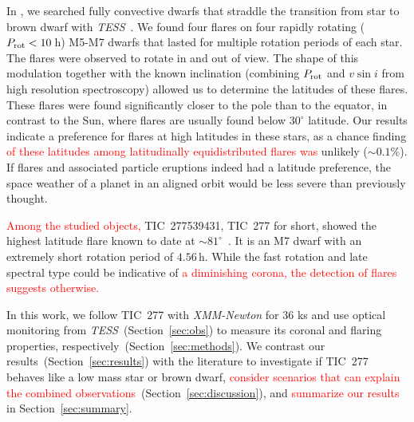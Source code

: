\documentclass[twocolumn]{aastex631}
\begin{document}
In \citet{ilin2021giant}, we searched fully convective dwarfs that straddle the transition from star to brown dwarf with \textit{TESS}~\citep{ricker2015transiting}. We found four flares on four rapidly rotating ($P_{\rm rot}<10\,$h) M5-M7 dwarfs that lasted for multiple rotation periods of each star. The flares were observed to rotate in and out of view. The shape of this modulation together with the known inclination (combining $P_{\rm rot}$ and $v \sin i$ from high resolution spectroscopy) allowed us to determine the latitudes of these flares. These flares were found significantly closer to the pole than to the equator, in contrast to the Sun, where flares are usually found below $30^{\circ}$ latitude. Our results indicate a preference for flares at high latitudes in these stars, as a chance finding \textcolor{red}{of these latitudes among latitudinally equidistributed flares was } unlikely ($\sim 0.1\%$). If flares and associated particle eruptions indeed had a latitude preference, the space weather of a planet in an aligned orbit would be less severe than previously thought. %


\textcolor{red}{Among the studied objects, }TIC~277539431, TIC~277 for short, showed the highest latitude flare known to date at $\sim81^{\circ}$~\citep[][Table \ref{tab:starparams}]{ilin2021giant}. It is an M7 dwarf with an extremely short rotation period of $4.56\,$h. While the fast rotation and late spectral type could be indicative of \textcolor{red}{a diminishing corona, the detection of flares suggests otherwise.} %

In this work, we follow TIC~277 with \textit{XMM-Newton} for 36 ks and use optical monitoring from \textit{TESS}~(Section~\ref{sec:obs}) to measure its coronal and flaring properties, respectively~(Section~\ref{sec:methods}). We contrast our results~(Section~\ref{sec:results}) with the literature to investigate if TIC~277 behaves like a low mass star or brown dwarf, \textcolor{red}{consider scenarios that can explain the combined observations}~(Section~\ref{sec:discussion}), and \textcolor{red}{summarize our results} in Section~\ref{sec:summary}.
\end{document}
